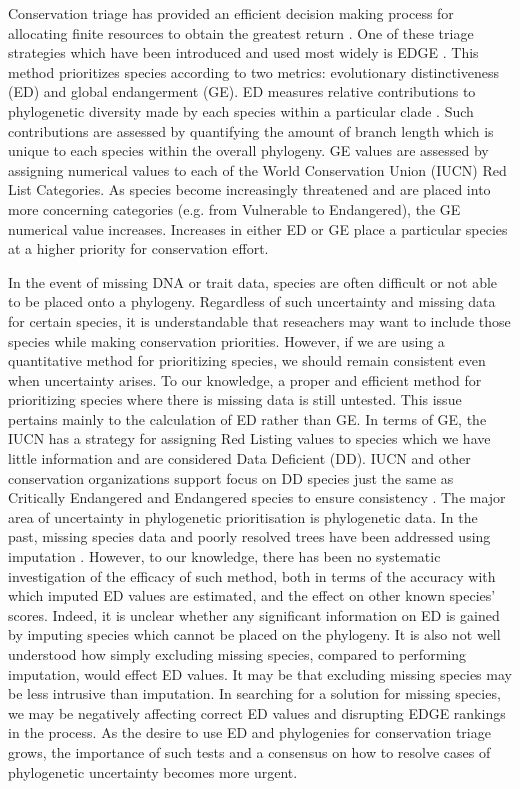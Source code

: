\documentclass[12pt,english]{article}
\begin{document}
Conservation triage has provided an efficient decision making process for
allocating finite resources to obtain the greatest return
\autocite{Bottrill2008}. One of these triage strategies which have been
introduced and used most widely is EDGE \autocite{Isaac2007}. This method
prioritizes species according to two metrics: evolutionary distinctiveness (ED)
and global endangerment (GE). ED measures relative contributions to phylogenetic
diversity made by each species within a particular clade \autocite{Isaac2007}.
Such contributions are assessed by quantifying the amount of branch length which
is unique to each species within the overall phylogeny. GE values are assessed
by assigning numerical values to each of the World Conservation Union (IUCN) Red
List Categories. As species become increasingly threatened and are placed into
more concerning categories (e.g. from Vulnerable to Endangered), the GE
numerical value increases. Increases in either ED or GE place a particular
species at a higher priority for conservation effort.

In the event of missing DNA or trait data, species are often difficult or not
able to be placed onto a phylogeny. Regardless of such uncertainty and missing
data for certain species, it is understandable that reseachers may want to
include those species while making conservation priorities. However, if we are
using a quantitative method for prioritizing species, we should remain
consistent even when uncertainty arises. To our knowledge, a proper and
efficient method for prioritizing species where there is missing data is still
untested. This issue pertains mainly to the calculation of ED rather than GE. In
terms of GE, the IUCN has a strategy for assigning Red Listing values to species
which we have little information and are considered Data Deficient (DD). IUCN
and other conservation organizations support focus on DD species just the same
as Critically Endangered and Endangered species to ensure consistency
\autocite{Rodrigues2006}. The major area of uncertainty in phylogenetic
prioritisation is phylogenetic data. In the past, missing species data and
poorly resolved trees have been addressed using imputation
\autocite{Collen2011, Isaac2012, Jetz2014}. However, to our knowledge, there has
been no systematic investigation of the efficacy of such method, both in
terms of the accuracy with which imputed ED values are estimated, and the effect
on other known species’ scores. Indeed, it is unclear whether any significant
information on ED is gained by imputing species which cannot be placed on the
phylogeny. It is also not well understood how simply excluding missing species,
compared to performing imputation, would effect ED values. It may be that
excluding missing species may be less intrusive than imputation. In searching
for a solution for missing species, we may be negatively affecting correct ED
values and disrupting EDGE rankings in the process. As the desire to use ED and
phylogenies for conservation triage grows, the importance of such tests and a
consensus on how to resolve cases of phylogenetic uncertainty becomes more
urgent.
\end{document}
